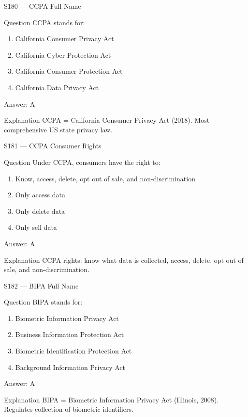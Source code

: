 \documentclass[aspectratio=169,8pt]{beamer}
\begin{document}
	\begin{frame}{S180 --- CCPA Full Name}
		\begin{block}{Question}
			CCPA stands for:
			\begin{enumerate}
				\item California Consumer Privacy Act
				\item California Cyber Protection Act
				\item California Consumer Protection Act
				\item California Data Privacy Act
			\end{enumerate}
		\end{block}
		\begin{exampleblock}{Answer: A}\end{exampleblock}
		\begin{block}{Explanation}
			CCPA = California Consumer Privacy Act (2018). Most comprehensive US state privacy law.
		\end{block}
	\end{frame}
	
	\begin{frame}{S181 --- CCPA Consumer Rights}
		\begin{block}{Question}
			Under CCPA, consumers have the right to:
			\begin{enumerate}
				\item Know, access, delete, opt out of sale, and non-discrimination
				\item Only access data
				\item Only delete data
				\item Only sell data
			\end{enumerate}
		\end{block}
		\begin{exampleblock}{Answer: A}\end{exampleblock}
		\begin{block}{Explanation}
			CCPA rights: know what data is collected, access, delete, opt out of sale, and non-discrimination.
		\end{block}
	\end{frame}
	
	\begin{frame}{S182 --- BIPA Full Name}
		\begin{block}{Question}
			BIPA stands for:
			\begin{enumerate}
				\item Biometric Information Privacy Act
				\item Business Information Protection Act
				\item Biometric Identification Protection Act
				\item Background Information Privacy Act
			\end{enumerate}
		\end{block}
		\begin{exampleblock}{Answer: A}\end{exampleblock}
		\begin{block}{Explanation}
			BIPA = Biometric Information Privacy Act (Illinois, 2008). Regulates collection of biometric identifiers.
		\end{block}
	\end{frame}
	
\end{document}
